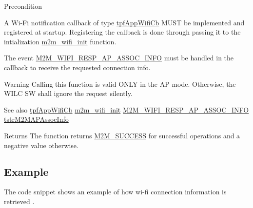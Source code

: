 \begin{DoxyPrecond}{Precondition}

\begin{DoxyItemize}
\item A Wi-\/\+Fi notification callback of type \hyperlink{group__WlanEnums_gac5302f32839285fe8375c159087aa8a1}{tpf\+App\+Wifi\+Cb} M\+U\+ST be implemented and registered at startup. Registering the callback is done through passing it to the intialization \hyperlink{group__WifiInitFn_ga73c734812e844d96d860c4e93e9daf35}{m2m\+\_\+wifi\+\_\+init} function.
\item The event \hyperlink{group__WlanEnums_ggaa62989ea5e2977b374a04db81c89d524ae44909b7e419ce7c69f64ab8399ea67d}{M2\+M\+\_\+\+W\+I\+F\+I\+\_\+\+R\+E\+S\+P\+\_\+\+A\+P\+\_\+\+A\+S\+S\+O\+C\+\_\+\+I\+N\+FO} must be handled in the callback to receive the requested connection info.
\end{DoxyItemize}
\end{DoxyPrecond}
\begin{DoxyWarning}{Warning}
Calling this function is valid O\+N\+LY in the AP mode. Otherwise, the W\+I\+LC SW shall ignore the request silently.
\end{DoxyWarning}
\begin{DoxySeeAlso}{See also}
\hyperlink{group__WlanEnums_gac5302f32839285fe8375c159087aa8a1}{tpf\+App\+Wifi\+Cb} \hyperlink{group__WifiInitFn_ga73c734812e844d96d860c4e93e9daf35}{m2m\+\_\+wifi\+\_\+init} \hyperlink{group__WlanEnums_ggaa62989ea5e2977b374a04db81c89d524ae44909b7e419ce7c69f64ab8399ea67d}{M2\+M\+\_\+\+W\+I\+F\+I\+\_\+\+R\+E\+S\+P\+\_\+\+A\+P\+\_\+\+A\+S\+S\+O\+C\+\_\+\+I\+N\+FO} \hyperlink{structtstrM2MAPAssocInfo}{tstr\+M2\+M\+A\+P\+Assoc\+Info}
\end{DoxySeeAlso}
\begin{DoxyReturn}{Returns}
The function returns \hyperlink{nm__common_8h_a9ef27ba27aafdd1aa3a79d3ba2c36b8f}{M2\+M\+\_\+\+S\+U\+C\+C\+E\+SS} for successful operations and a negative value otherwise. 
\end{DoxyReturn}
\hypertarget{group__WifiEnableMonitorModeFn_Example}{}\subsection{Example}\label{group__WifiEnableMonitorModeFn_Example}
The code snippet shows an example of how wi-\/fi connection information is retrieved . 
